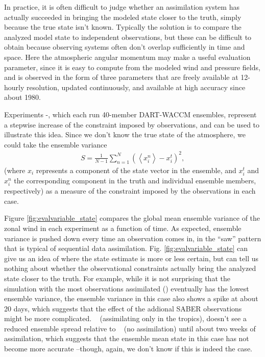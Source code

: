 In practice, it is often difficult to judge whether an assimilation system has actually succeeded in bringing the modeled state closer to the truth, simply because the true state isn't known. 
Typically the solution is to compare the analyzed model state to independent observations, but these can be difficult to obtain because observing systems often don't overlap sufficiently in time and space.
Here the atmospheric angular momentum may make a useful evaluation parameter, since it is easy to compute from the modeled wind and pressure fields, and is observed in the form of three parameters that are freely available at 12-hourly resolution, updated continuously, and available at high accuracy since about 1980.  

Experiments \WACCMNODA-\NCARFULL, which each run 40-member DART-WACCM ensembles, 
represent a stepwise increase of the constraint imposed by observations, and can be used to illustrate this idea.
Since we don't know the true state of the atmosphere, we could take the ensemble variance 
\begin{eqnarray}
S = 
\frac{1}{N-1}
\sum_{n=1}^N
\left(
	\left< x_{i}^{n} \right>-x_i^t
\right)^2,
\label{eq:spread}
\end{eqnarray}
(where $x_{i}$ represents a component of the state vector in the ensemble,  and $x_{i}^t$ and $x_{i}^n$ the corresponding component in the truth and individual ensemble members, respectively) as a measure of the constraint imposed by the observations in each case. 

Figure \ref{fig:evalvariable_state} compares 
the global mean ensemble variance of the zonal wind in each experiment as a function of time.  
As expected, ensemble variance is pushed down every time an observation comes in, in the ``saw'' pattern that is typical of sequential data assimilation. 
Fig.  \ref{fig:evalvariable_state} can give us an idea of where the state estimate is more or less certain, but can tell us nothing about whether the observational constraints actually bring the analyzed state closer to the truth. 
For example, while it is not surprising that the simulation with the most observations assimilated (\NCARFULL) eventually has the lowest ensemble variance, the ensemble variance in this case also shows a spike at about 20 days, which suggests that the effect of the addional SABER observations might be more complicated. 
\WACCMTROPICS~ (assimilating only in the tropics), doesn't see a reduced ensemble spread relative to \NODA~ (no assimilation) until about two weeks of assimilation, which suggests that the ensemble mean state in this case has not become more accurate --though, again, we don't know if this is indeed the case.  


